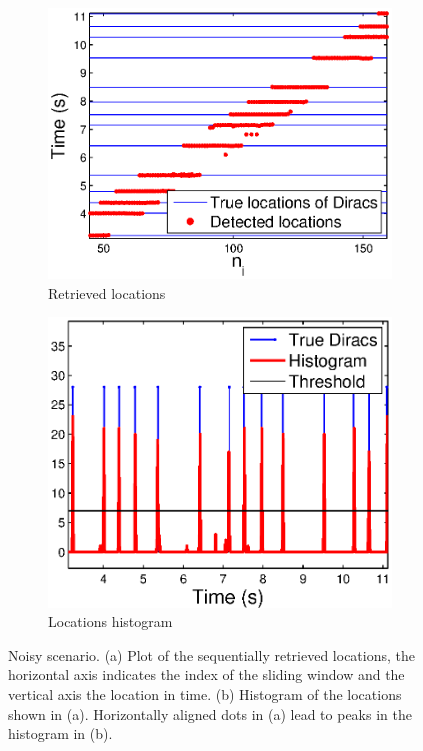 \documentclass{article}
\begin{document}
\begin{figure}[t]
\centering
\begin{subfigure}{.22\textwidth}
\includegraphics[width=\linewidth]{figures/noisy_scatter}
\caption{Retrieved locations}
\end{subfigure}
\begin{subfigure}{.22\textwidth}
\includegraphics[width=\linewidth]{figures/noisy_histogram}
\caption{Locations histogram}
\end{subfigure}
\caption{Noisy scenario. (a) Plot of the sequentially retrieved locations, the horizontal 
axis indicates the index of the sliding window and the vertical axis the location in time.
(b) Histogram of the locations shown in (a). Horizontally aligned dots in (a) lead to peaks 
in the histogram in (b).}
\label{fig:noisy_locs}
\end{figure}
\end{document}
